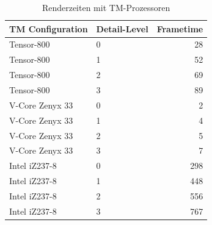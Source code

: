 \begin{table}[!htbp] %
    \centering
    \begin{tabular}{|l|l|r|}
        \hline
        \textbf{TM Configuration}   &   \textbf{Detail-Level}   &   \textbf{Frametime}\\
        \hline
        \hline
        Tensor-800                  &   0                       &   28\\
        Tensor-800                  &   1                       &   52\\
        Tensor-800                  &   2                       &   69\\
        Tensor-800                  &   3                       &   89\\
        \hdashline
        V-Core Zenyx 33             &   0                       &   2\\
        V-Core Zenyx 33             &   1                       &   4\\
        V-Core Zenyx 33             &   2                       &   5\\
        V-Core Zenyx 33             &   3                       &   7\\
        \hdashline
        Intel iZ237-8               &   0                       &   298\\
        Intel iZ237-8               &   1                       &   448\\
        Intel iZ237-8               &   2                       &   556\\
        Intel iZ237-8               &   3                       &   767\\
        \hline
    \end{tabular}
    \caption{Renderzeiten mit TM-Prozessoren}
    \label{tbl:renderzeiten_tm_processors}
\end{table}
